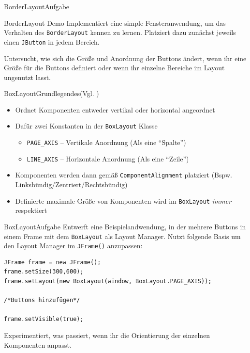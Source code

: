 \begin{frame}{BorderLayout}{Aufgabe}
    \begin{alertblock}{BorderLayout Demo}
    Implementiert eine simple Fensteranwendung, um das Verhalten des \texttt{BorderLayout} kennen zu lernen. Platziert dazu zunächst jeweils einen \texttt{JButton} in
    jedem Bereich. 
    
    Untersucht, wie sich die Größe und Anordnung der Buttons ändert, wenn ihr eine Größe für die Buttons definiert oder wenn ihr einzelne Bereiche im Layout ungenutzt lasst.
    \end{alertblock}
\end{frame}

\begin{frame}{BoxLayout}{Grundlegendes(Vgl. \cite{orac:boxlayout})}
    \begin{itemize}
        \item Ordnet Komponenten entweder vertikal oder horizontal angeordnet
        \item Dafür zwei Konstanten in der \texttt{BoxLayout} Klasse
        \begin{itemize}
            \item \texttt{PAGE\_AXIS} -- Vertikale Anordnung (Als eine "`Spalte"')
            \item \texttt{LINE\_AXIS} -- Horizontale Anordnung (Als eine "`Zeile"')
        \end{itemize}
        \item Komponenten werden dann gemäß \texttt{ComponentAlignment} platziert (Bspw. Linksbündig/Zentriert/Rechtsbündig)
        \item Definierte maximale Größe von Komponenten wird im \texttt{BoxLayout} \textit{immer} respektiert
    \end{itemize}
\end{frame}

\begin{frame}[fragile]{BoxLayout}{Aufgabe}
Entwerft eine Beispielandwendung, in der mehrere Buttons in einem Frame mit dem \texttt{BoxLayout} als Layout Manager. Nutzt folgende Basis um den Layout Manager im \texttt{JFrame()} anzupassen:

\lstset{style=java}
\begin{lstlisting}
JFrame frame = new JFrame();
frame.setSize(300,600);
frame.setLayout(new BoxLayout(window, BoxLayout.PAGE_AXIS));

/*Buttons hinzufügen*/

frame.setVisible(true);
\end{lstlisting}

Experimentiert, was passiert, wenn ihr die Orientierung der einzelnen Komponenten anpasst.
\end{frame}

